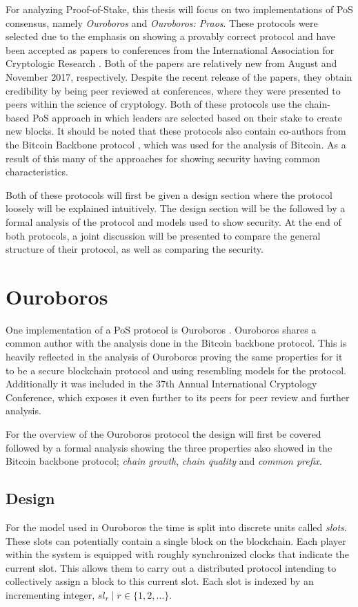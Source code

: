 For analyzing Proof-of-Stake, this thesis will focus on two implementations of PoS consensus, namely \emph{Ouroboros} and \emph{Ouroboros: Praos}. These protocols were selected due to the emphasis on showing a provably correct protocol and have been accepted as papers to conferences from the International Association for Cryptologic Research \cite{iacr-ouro}\cite{iacr-praos}. Both of the papers are relatively new from August and November 2017, respectively. Despite the recent release of the papers, they obtain credibility by being peer reviewed at conferences, where they were presented to peers within the science of cryptology. Both of these protocols use the chain-based PoS approach in which leaders are selected based on their stake to create new blocks. It should be noted that these protocols also contain co-authors from the Bitcoin Backbone protocol \cite{bitcoin-backbone}, which was used for the analysis of Bitcoin. As a result of this many of the approaches for showing security having common characteristics.

Both of these protocols will first be given a design section where the protocol loosely will be explained intuitively. The design section will be the followed by a formal analysis of the protocol and models used to show security. At the end of both protocols, a joint discussion will be presented to compare the general structure of their protocol, as well as comparing the security.


\section{Ouroboros}
One implementation of a PoS protocol is Ouroboros \cite{ouroboros}. Ouroboros shares a common author with the analysis done in the Bitcoin backbone protocol. This is heavily reflected in the analysis of Ouroboros proving the same properties for it to be a secure blockchain protocol and using resembling models for the protocol. Additionally it was included in the 37th Annual International Cryptology Conference, which exposes it even further to its peers for peer review and further analysis.

For the overview of the Ouroboros protocol the design will first be covered followed by a formal analysis showing the three properties also showed in the Bitcoin backbone protocol; \emph{chain growth}, \emph{chain quality} and \emph{common prefix}.


\subsection{Design}
For the model used in Ouroboros the time is split into discrete units called \emph{slots}. These slots can potentially contain a single block on the blockchain. Each player within the system is equipped with roughly synchronized clocks that indicate the current slot. This allows them to carry out a distributed protocol intending to collectively assign a block to this current slot. Each slot is indexed by an incrementing integer, $sl_r \; | \; r \in \{1,2,\dots \}$. \\

